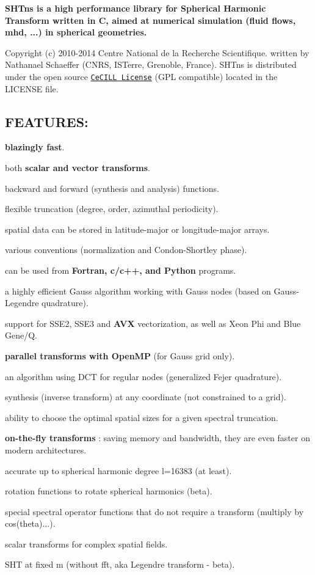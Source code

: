 {\bfseries S\+H\+Tns is a high performance library for Spherical Harmonic Transform written in C, aimed at numerical simulation (fluid flows, mhd, ...) in spherical geometries.}

Copyright (c) 2010-\/2014 Centre National de la Recherche Scientifique. written by Nathanael Schaeffer (C\+N\+R\+S, I\+S\+Terre, Grenoble, France). S\+H\+Tns is distributed under the open source \href{http://www.cecill.info/licences/Licence_CeCILL_V2.1-en.html}{\tt Ce\+C\+I\+L\+L License} (G\+P\+L compatible) located in the L\+I\+C\+E\+N\+S\+E file.

\subsection*{F\+E\+A\+T\+U\+R\+E\+S\+: }


\begin{DoxyItemize}
\item {\bfseries blazingly fast}.
\item both {\bfseries scalar and vector transforms}.
\item backward and forward (synthesis and analysis) functions.
\item flexible truncation (degree, order, azimuthal periodicity).
\item spatial data can be stored in latitude-\/major or longitude-\/major arrays.
\item various conventions (normalization and Condon-\/\+Shortley phase).
\item can be used from {\bfseries Fortran, c/c++, and Python} programs.
\item a highly efficient Gauss algorithm working with Gauss nodes (based on Gauss-\/\+Legendre quadrature).
\item support for S\+S\+E2, S\+S\+E3 and {\bfseries A\+V\+X} vectorization, as well as Xeon Phi and Blue Gene/\+Q.
\item {\bfseries parallel transforms with Open\+M\+P} (for Gauss grid only).
\item an algorithm using D\+C\+T for regular nodes (generalized Fejer quadrature).
\item synthesis (inverse transform) at any coordinate (not constrained to a grid).
\item ability to choose the optimal spatial sizes for a given spectral truncation.
\item {\bfseries on-\/the-\/fly transforms} \+: saving memory and bandwidth, they are even faster on modern architectures.
\item accurate up to spherical harmonic degree l=16383 (at least).
\item rotation functions to rotate spherical harmonics (beta).
\item special spectral operator functions that do not require a transform (multiply by cos(theta)...).
\item scalar transforms for complex spatial fields.
\item S\+H\+T at fixed m (without fft, aka Legendre transform -\/ beta).
\end{DoxyItemize}


